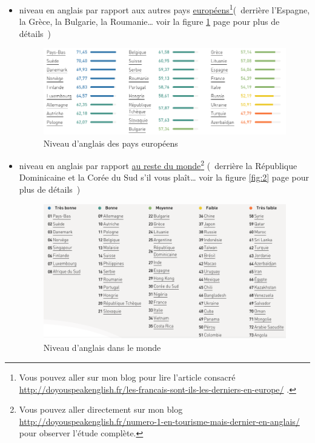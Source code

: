 \begin{itemize}
\item niveau en anglais par rapport aux autres pays
  \href{http://doyouspeakenglish.fr/les-francais-sont-ils-les-derniers-en-europe/}{européens}\footnote{Vous
    pouvez aller sur mon blog pour lire l'article consacré
    \url{http://doyouspeakenglish.fr/les-francais-sont-ils-les-derniers-en-europe/} .}(~derrière l'Espagne, la Grèce, la Bulgarie, la Roumanie\ldots{} voir la figure
  \ref{fig:1} page \pageref{fig:1} pour plus de détails~)
  \begin{figure}[h]
    \centering
    \caption[L'anglais en Europe]{Niveau d'anglais des
      pays européens}\vspace{.1cm}
    \includegraphics[scale=.5]{../img/french-english-level-in-europe}
    
    \label{fig:1}
  \end{figure}
\item niveau en anglais par rapport \href{http://doyouspeakenglish.fr/numero-1-en-tourisme-mais-dernier-en-anglais/}{au
    reste du monde}\footnote{Vous pouvez aller directement sur mon blog
  \url{http://doyouspeakenglish.fr/numero-1-en-tourisme-mais-dernier-en-anglais/} pour observer l'étude complète.}
(~derrière la République Dominicaine et la Corée du Sud s'il vous
plaît\ldots{} voir la figure \ref{fig:2} page \pageref{fig:2} pour
plus de détails~)
  \begin{figure}[h]
    \centering
    \caption[L'anglais dans le monde]{Niveau d'anglais dans le monde}\vspace{.1cm}
    \includegraphics[scale=.5]{../img/english-level-in-the-world}
    

\end{figure}
\end{itemize}
